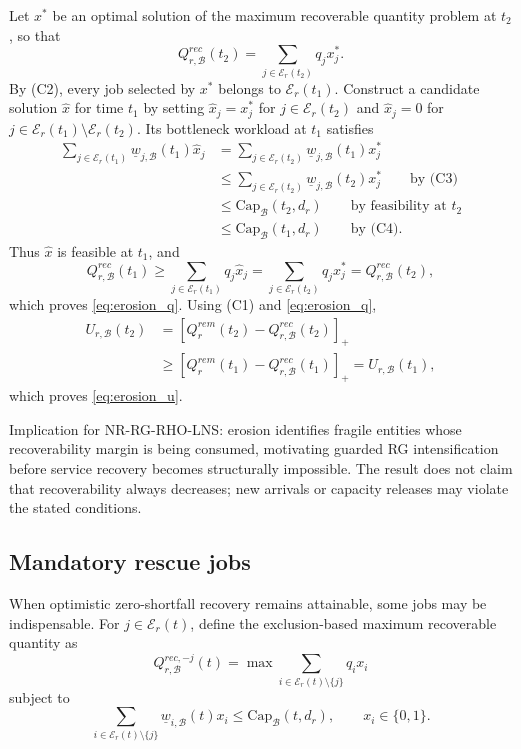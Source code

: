 \documentclass[a4paper,fleqn]{cas-sc}
\begin{document}
\begin{pf}
Let \(x^*\) be an optimal solution of the maximum recoverable quantity problem at \(t_2\), so that
\[
Q_{r,\mathcal B}^{rec}(t_2)
=
\sum_{j\in\mathcal E_r(t_2)}q_jx_j^*.
\]
By (C2), every job selected by \(x^*\) belongs to \(\mathcal E_r(t_1)\). Construct a candidate solution \(\hat x\) for time \(t_1\) by setting \(\hat x_j=x_j^*\) for \(j\in\mathcal E_r(t_2)\) and \(\hat x_j=0\) for \(j\in\mathcal E_r(t_1)\setminus\mathcal E_r(t_2)\). Its bottleneck workload at \(t_1\) satisfies
\begin{align}
\sum_{j\in\mathcal E_r(t_1)}
\underline w_{j,\mathcal B}(t_1)\hat x_j
&=
\sum_{j\in\mathcal E_r(t_2)}
\underline w_{j,\mathcal B}(t_1)x_j^*
\nonumber\\
&\le
\sum_{j\in\mathcal E_r(t_2)}
\underline w_{j,\mathcal B}(t_2)x_j^*
\qquad \text{by (C3)}
\nonumber\\
&\le
\mathrm{Cap}_{\mathcal B}(t_2,d_r)
\qquad \text{by feasibility at \(t_2\)}
\nonumber\\
&\le
\mathrm{Cap}_{\mathcal B}(t_1,d_r)
\qquad \text{by (C4)}.
\nonumber
\end{align}
Thus \(\hat x\) is feasible at \(t_1\), and
\[
Q_{r,\mathcal B}^{rec}(t_1)
\ge
\sum_{j\in\mathcal E_r(t_1)}q_j\hat x_j
=
\sum_{j\in\mathcal E_r(t_2)}q_jx_j^*
=
Q_{r,\mathcal B}^{rec}(t_2),
\]
which proves \eqref{eq:erosion_q}. Using (C1) and \eqref{eq:erosion_q},
\begin{align}
U_{r,\mathcal B}(t_2)
&=
[Q_r^{rem}(t_2)-Q_{r,\mathcal B}^{rec}(t_2)]_+
\nonumber\\
&\ge
[Q_r^{rem}(t_1)-Q_{r,\mathcal B}^{rec}(t_1)]_+
=
U_{r,\mathcal B}(t_1),
\nonumber
\end{align}
which proves \eqref{eq:erosion_u}.
\end{pf}

Implication for NR-RG-RHO-LNS: erosion identifies fragile entities whose recoverability margin is being consumed, motivating guarded RG intensification before service recovery becomes structurally impossible. The result does not claim that recoverability always decreases; new arrivals or capacity releases may violate the stated conditions.

\subsection{Mandatory rescue jobs}
\label{sec:mandatory_rescue}

When optimistic zero-shortfall recovery remains attainable, some jobs may be indispensable. For \(j\in\mathcal E_r(t)\), define the exclusion-based maximum recoverable quantity as
\begin{equation}
Q_{r,\mathcal B}^{rec,-j}(t)
=
\max
\sum_{i\in\mathcal E_r(t)\setminus\{j\}}q_i x_i
\label{eq:exclusion_recoverable}
\end{equation}
subject to
\begin{equation}
\sum_{i\in\mathcal E_r(t)\setminus\{j\}}
\underline w_{i,\mathcal B}(t)x_i
\le
\mathrm{Cap}_{\mathcal B}(t,d_r),
\qquad
x_i\in\{0,1\}.
\label{eq:exclusion_capacity}
\end{equation}
\end{document}
